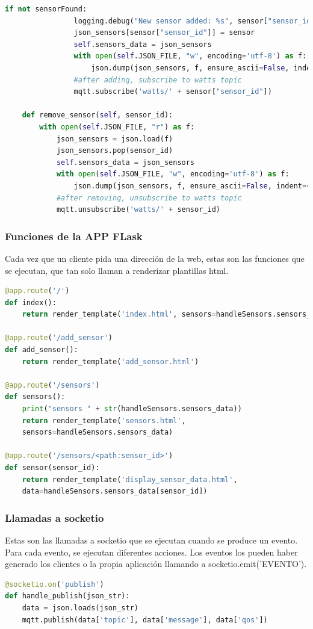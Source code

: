 \begin{titlepage}
\begin{lstlisting}[language=python]
            if not sensorFound:
                logging.debug("New sensor added: %s", sensor["sensor_id"])
                json_sensors[sensor["sensor_id"]] = sensor
                self.sensors_data = json_sensors
                with open(self.JSON_FILE, "w", encoding='utf-8') as f:
                    json.dump(json_sensors, f, ensure_ascii=False, indent=4)
                #after adding, subscribe to watts topic
                mqtt.subscribe('watts/' + sensor["sensor_id"])
    
    def remove_sensor(self, sensor_id):
        with open(self.JSON_FILE, "r") as f:
            json_sensors = json.load(f)
            json_sensors.pop(sensor_id)
            self.sensors_data = json_sensors
            with open(self.JSON_FILE, "w", encoding='utf-8') as f:
                json.dump(json_sensors, f, ensure_ascii=False, indent=4)
            #after removing, unsubscribe to watts topic
            mqtt.unsubscribe('watts/' + sensor_id)
\end{lstlisting}

\subsubsection{Funciones de la APP FLask}
Cada vez que un cliente pida una dirección de la web, estas son las funciones que se ejecutan, que tan solo llaman a renderizar plantillas html.\\
\begin{lstlisting}[language=python]
@app.route('/')
def index():
    return render_template('index.html', sensors=handleSensors.sensors_data)

@app.route('/add_sensor')
def add_sensor():
	return render_template('add_sensor.html')

@app.route('/sensors')
def sensors():
	print("sensors " + str(handleSensors.sensors_data))
	return render_template('sensors.html', 
	sensors=handleSensors.sensors_data)

@app.route('/sensors/<path:sensor_id>')
def sensor(sensor_id):
	return render_template('display_sensor_data.html', 
	data=handleSensors.sensors_data[sensor_id])
\end{lstlisting}

\subsubsection{Llamadas a socketio}
Estas son las llamadas a socketio que se ejecutan cuando se produce un evento. Para cada evento, se ejecutan diferentes acciones. Los eventos los pueden haber generado los clientes o la propia aplicación llamando a socketio.emit('EVENTO').\\
\begin{lstlisting}[language=python]
@socketio.on('publish')
def handle_publish(json_str):
	data = json.loads(json_str)
	mqtt.publish(data['topic'], data['message'], data['qos'])



\end{lstlisting}
\end{titlepage}
